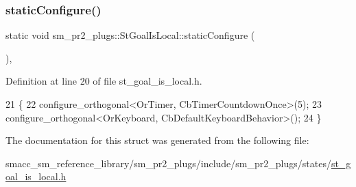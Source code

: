 \subsubsection{\texorpdfstring{static\+Configure()}{staticConfigure()}}
{\footnotesize\ttfamily static void sm\+\_\+pr2\+\_\+plugs\+::\+St\+Goal\+Is\+Local\+::static\+Configure (\begin{DoxyParamCaption}{ }\end{DoxyParamCaption})\hspace{0.3cm}{\ttfamily [inline]}, {\ttfamily [static]}}



Definition at line 20 of file st\+\_\+goal\+\_\+is\+\_\+local.\+h.


\begin{DoxyCode}
21     \{
22         configure\_orthogonal<OrTimer,  CbTimerCountdownOnce>(5);    
23         configure\_orthogonal<OrKeyboard, CbDefaultKeyboardBehavior>();
24     \}
\end{DoxyCode}


The documentation for this struct was generated from the following file\+:\begin{DoxyCompactItemize}
\item 
smacc\+\_\+sm\+\_\+reference\+\_\+library/sm\+\_\+pr2\+\_\+plugs/include/sm\+\_\+pr2\+\_\+plugs/states/\hyperlink{st__goal__is__local_8h}{st\+\_\+goal\+\_\+is\+\_\+local.\+h}\end{DoxyCompactItemize}
